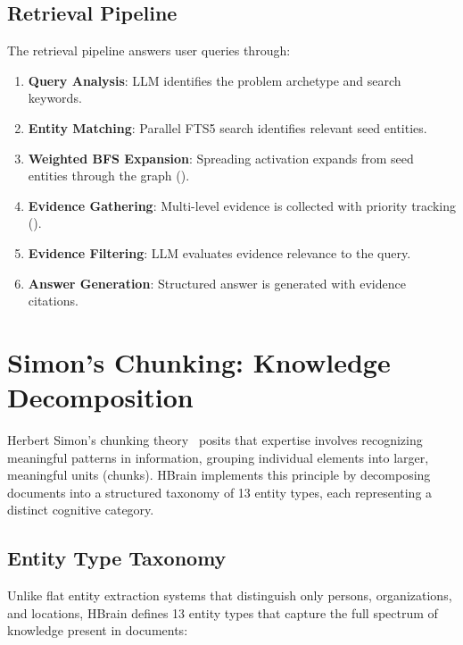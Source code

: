 \documentclass[11pt]{article}
\begin{document}
\subsection{Retrieval Pipeline}

The retrieval pipeline answers user queries through:

\begin{enumerate}
    \item \textbf{Query Analysis}: LLM identifies the problem archetype and search keywords.
    \item \textbf{Entity Matching}: Parallel FTS5 search identifies relevant seed entities.
    \item \textbf{Weighted BFS Expansion}: Spreading activation expands from seed entities through the graph ().
    \item \textbf{Evidence Gathering}: Multi-level evidence is collected with priority tracking ().
    \item \textbf{Evidence Filtering}: LLM evaluates evidence relevance to the query.
    \item \textbf{Answer Generation}: Structured answer is generated with evidence citations.
\end{enumerate}

\section{Simon's Chunking: Knowledge Decomposition}
\label{sec:chunking}

Herbert Simon's chunking theory~\cite{simon1974chunk} posits that expertise involves recognizing meaningful patterns in information, grouping individual elements into larger, meaningful units (chunks). HBrain implements this principle by decomposing documents into a structured taxonomy of 13 entity types, each representing a distinct cognitive category.

\subsection{Entity Type Taxonomy}

Unlike flat entity extraction systems that distinguish only persons, organizations, and locations, HBrain defines 13 entity types that capture the full spectrum of knowledge present in documents:
\end{document}
